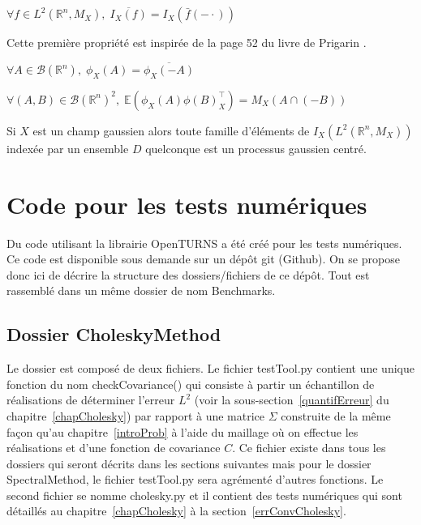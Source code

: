 \begin{property}
$\forall f \in L^2(\mathbb{R}^n, M_X),\; \overline{I_X(f)} = I_X(\bar{f}(-\cdot))$
\end{property}

\begin{remark} \noindent Cette première propriété est inspirée de la page 52 du livre de Prigarin \cite{bookPS}. \end{remark}

\begin{property}
$\forall A \in \mathcal{B}(\mathbb{R}^n),\; \phi_X(A) = \overline{\phi_X(-A)}$
\end{property}

\begin{property}$\forall (A,B) \in \mathcal{B}(\mathbb{R}^n)^2, \; \mathbb{E}(\phi_X(A)\phi(B)_{X}^{\top}) = M_X(A \cap (-B))$ 
\end{property}

\begin{property}
Si $X$ est un champ gaussien alors toute famille d'éléments de $I_X(L^{2}(\mathbb{R}^n, M_X))$ indexée par un ensemble $D$ quelconque est un processus gaussien centré. 
\end{property}


\chapter{Code pour les tests numériques}
\label{codeNumAnnexe}
Du code utilisant la librairie OpenTURNS a été créé pour les tests numériques.
Ce code est disponible sous demande sur un dépôt git (Github). On se propose donc ici de décrire la structure des dossiers/fichiers de ce dépôt.
Tout est rassemblé dans un même dossier de nom Benchmarks.

\section{Dossier CholeskyMethod}
\label{dossCholeskyM}
Le dossier est composé de deux fichiers. Le fichier testTool.py contient une unique fonction
du nom checkCovariance() qui consiste à partir un échantillon de réalisations de déterminer l'erreur
$L^2$ (voir la sous-section~\ref{quantifErreur} du chapitre~\ref{chapCholesky}) par rapport à une matrice $\Sigma$ construite de la même façon qu'au chapitre~\ref{introProb} à l'aide
du maillage où on effectue les réalisations et d'une fonction de covariance $C$. Ce fichier existe dans tous les dossiers qui seront décrits dans les sections suivantes
mais pour le dossier SpectralMethod, le fichier testTool.py sera agrémenté d'autres fonctions.
Le second fichier se nomme cholesky.py et il contient des tests numériques qui sont détaillés
au chapitre~\ref{chapCholesky} à la section~\ref{errConvCholesky}.
